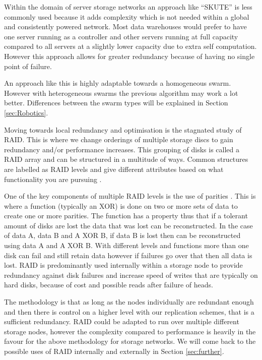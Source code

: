 \documentclass{UoYCSproject}
\begin{document}
Within the domain of server storage networks an approach like “SKUTE” is less commonly used because it adds complexity which is not needed within a global and consistently powered network. 
Most data warehouses would prefer to have one server running as a controller and other servers running at full capacity compared to all servers at a slightly lower capacity due to extra self computation. 
However this approach allows for greater redundancy because of having no single point of failure.

An approach like this is highly adaptable towards a homogeneous swarm. 
However with heterogeneous swarms the previous algorithm may work a lot better. 
Differences between the swarm types will be explained in Section \ref{sec:Robotics}. 

Moving towards local redundancy and optimisation is the stagnated study of RAID. 
This is where we change orderings of multiple storage discs to gain redundancy and/or performance increases. 
This grouping of disks is called a RAID array and can be structured in a multitude of ways. 
Common structures are labelled as RAID levels and give different attributes based on what functionality you are pursuing \cite{RAID Levels}. 

One of the key components of multiple RAID levels is the use of parities \cite{Raid parity}. 
This is where a function (typically an XOR) is done on two or more sets of data to create one or more parities. 
The function has a property thus that if a tolerant amount of disks are lost the data that was lost can be reconstructed. 
In the case of data A, data B and A XOR B, if data B is lost then can be reconstructed using data A and A XOR B. 
With different levels and functions more than one disk can fail and still retain data however if failures go over that then all data is lost. 
RAID is predominantly used internally within a storage node to provide redundancy against disk failures and increase speed of writes that are typically on hard disks, because of cost and possible reads after failure of heads. 

The methodology is that as long as the nodes individually are redundant enough and then there is control on a higher level with our replication schemes, that is a sufficient redundancy. 
RAID could be adapted to run over multiple different storage nodes, however the complexity compared to performance is heavily in the favour for the above methodology for storage networks. 
We will come back to the possible uses of RAID internally and externally in Section \ref{sec:further}.
\end{document}
